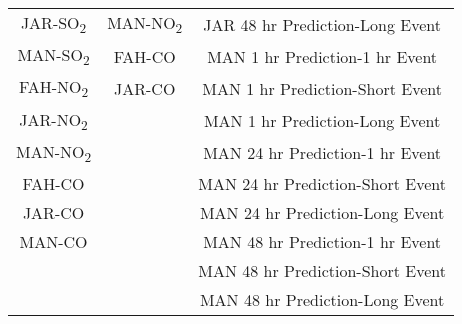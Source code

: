\begin{table}[H]
\begin{tabular}{@{}ccc@{}}
JAR-SO\textsubscript{2}              & MAN-NO\textsubscript{2}                 & JAR 48 hr Prediction-Long Event  \\
MAN-SO\textsubscript{2}              & FAH-CO                  & MAN 1 hr Prediction-1 hr Event   \\
FAH-NO\textsubscript{2}              & JAR-CO                  & MAN 1 hr Prediction-Short Event  \\
JAR-NO\textsubscript{2}              &                       & MAN 1 hr Prediction-Long Event   \\
MAN-NO\textsubscript{2}              &                        & MAN 24 hr Prediction-1 hr Event  \\
FAH-CO               &                        & MAN 24 hr Prediction-Short Event \\  
JAR-CO               &                       & MAN 24 hr Prediction-Long Event  \\
MAN-CO               &                       & MAN 48 hr Prediction-1 hr Event  \\
                &                      & MAN 48 hr Prediction-Short Event \\
                  &                       & MAN 48 hr Prediction-Long Event  \\ \bottomrule
\end{tabular}
\end{table}